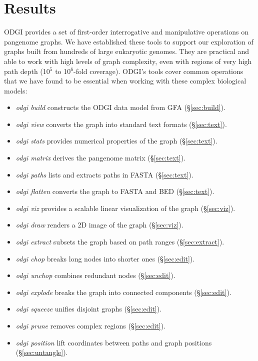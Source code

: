 \documentclass{bioinfo}
\begin{document}


\section{Results}

ODGI provides a set of first-order interrogative and manipulative operations on pangenome graphs.
We have established these tools to support our exploration of graphs built from hundreds of large eukaryotic genomes.
They are practical and able to work with high levels of graph complexity, even with regions of very high path depth (10$^5$ to 10$^6$-fold coverage).
ODGI's tools cover common operations that we have found to be essential when working with these complex biological models:

\begin{itemize}
\item \textit{odgi build} constructs the ODGI data model from GFA (\S\ref{sec:build}).
\item \textit{odgi view} converts the graph into standard text formats (\S\ref{sec:text}).
\item \textit{odgi stats} provides numerical properties of the graph (\S\ref{sec:text}).
\item \textit{odgi matrix} derives the pangenome matrix (\S\ref{sec:text}).
\item \textit{odgi paths} lists and extracts paths in FASTA (\S\ref{sec:text}).
\item \textit{odgi flatten} converts the graph to FASTA and BED (\S\ref{sec:text}).
\item \textit{odgi viz} provides a scalable linear visualization of the graph (\S\ref{sec:viz}).
\item \textit{odgi draw} renders a 2D image of the graph (\S\ref{sec:viz}).
\item \textit{odgi extract} subsets the graph based on path ranges (\S\ref{sec:extract}).
\item \textit{odgi chop} breaks long nodes into shorter ones (\S\ref{sec:edit}).
\item \textit{odgi unchop} combines redundant nodes (\S\ref{sec:edit}).
\item \textit{odgi explode} breaks the graph into connected components (\S\ref{sec:edit}).
\item \textit{odgi squeeze} unifies disjoint graphs (\S\ref{sec:edit}).
\item \textit{odgi prune} removes complex regions (\S\ref{sec:edit}).
\item \textit{odgi position} lift coordinates between paths and graph positions (\S\ref{sec:untangle}).

\end{itemize}
\end{document}
